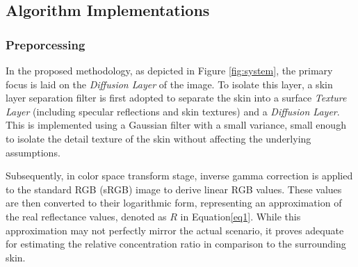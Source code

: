 \begin{spacing}{1.5}
\subsection{Algorithm Implementations}
\subsubsection{Preporcessing}
In the proposed methodology, as depicted in Figure \ref{fig:system}, the primary focus is laid on the \textit{Diffusion Layer} of the image. To isolate this layer, a skin layer separation filter is first adopted to separate the skin into a surface \textit{Texture Layer} (including specular reflections and skin textures) and a \textit{Diffusion Layer}. This is implemented using a Gaussian filter with a small variance, small enough to isolate the detail texture of the skin without affecting the underlying assumptions. 

Subsequently, in color space transform stage, inverse gamma correction is applied to the standard RGB (sRGB) image to derive linear RGB values. These values are then converted to their logarithmic form, representing an approximation of the real reflectance values, denoted as $R$ in Equation\ref{eq1}. While this approximation may not perfectly mirror the actual scenario, it proves adequate for estimating the relative concentration ratio in comparison to the surrounding skin.

\end{spacing}

